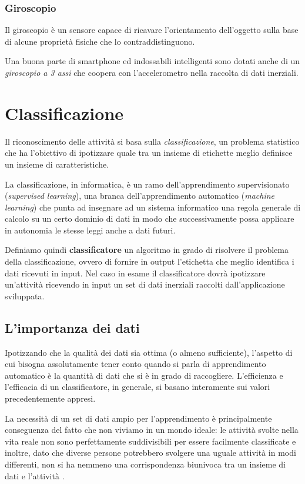 \subsubsection{Giroscopio}
Il giroscopio è un sensore capace di ricavare l'orientamento dell'oggetto sulla base di alcune proprietà fisiche che lo contraddistinguono.

Una buona parte di smartphone ed indossabili intelligenti sono dotati anche di un \textit{giroscopio a 3 assi} che coopera 
con l'accelerometro nella raccolta di dati inerziali.

\section{Classificazione}
Il riconoscimento delle attività si basa sulla \textit{classificazione}, un problema statistico che ha l'obiettivo di ipotizzare 
quale tra un insieme di etichette meglio definisce un insieme di caratteristiche. 

La classificazione, in informatica, è un ramo dell'apprendimento supervisionato (\textit{supervised learning}),
una branca dell'apprendimento automatico (\textit{machine learning}) che punta ad insegnare ad un sistema informatico una regola generale
di calcolo su un certo dominio di dati in modo che successivamente possa applicare in autonomia le stesse leggi anche a dati futuri.

Definiamo quindi \textbf{classificatore} un algoritmo in grado di risolvere il problema della classificazione, ovvero di fornire in output 
l'etichetta che meglio identifica i dati ricevuti in input.
Nel caso in esame il classificatore dovrà ipotizzare un'attività ricevendo in input un set di dati inerziali 
raccolti dall'applicazione sviluppata.

\subsection{L'importanza dei dati}
Ipotizzando che la qualità dei dati sia ottima (o almeno sufficiente), l'aspetto di cui bisogna assolutamente tener conto quando 
si parla di apprendimento automatico è la quantità di dati che si è in grado di raccogliere. 
L'efficienza e l'efficacia di un classificatore, in generale, si basano interamente sui valori precedentemente appresi.

La necessità di un set di dati ampio per l'apprendimento è principalmente conseguenza del fatto che non viviamo in un mondo ideale: 
le attività svolte nella vita reale non sono perfettamente suddivisibili per essere facilmente classificate e inoltre, dato che diverse persone
potrebbero svolgere una uguale attività in modi differenti, non si ha nemmeno una corrispondenza biunivoca tra un insieme di dati e l'attività \cite{framework_long_term_data_har}.



